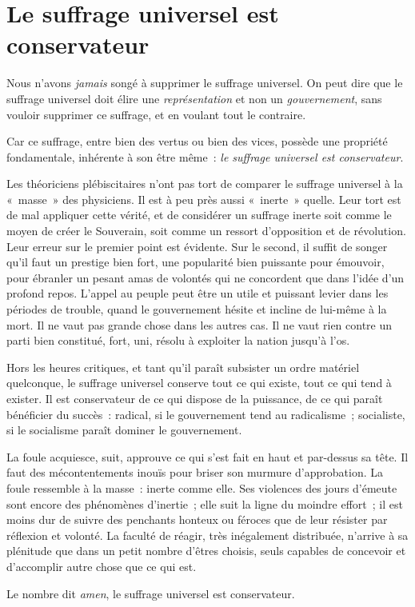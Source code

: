\documentclass[french,twoside]{book} %
\begin{document}
\section[{Le suffrage universel est conservateur}]{Le suffrage universel est conservateur}
\noindent Nous n’avons \emph{jamais} songé à supprimer le suffrage universel. On peut dire que le suffrage universel doit élire une \emph{représentation} et non un \emph{gouvernement}, sans vouloir supprimer ce suffrage, et en voulant tout le contraire.\par
Car ce suffrage, entre bien des vertus ou bien des vices, possède une propriété fondamentale, inhérente à son être même : \emph{le suffrage universel est conservateur}.\par
Les théoriciens plébiscitaires n’ont pas tort de comparer le suffrage universel à la « masse » des physiciens. Il est à peu près aussi « inerte » quelle. Leur tort est de mal appliquer cette vérité, et de considérer un suffrage inerte soit comme le moyen de créer le Souverain, soit comme un ressort d’opposition et de révolution. Leur erreur sur le premier point est évidente. Sur le second, il suffit de songer qu’il faut un prestige bien fort, une popularité bien puissante pour émouvoir, pour ébranler un pesant amas de volontés qui ne concordent que dans l’idée d’un profond repos. L’appel au peuple peut être un utile et puissant levier dans les périodes de trouble, quand le gouvernement hésite et incline de lui-même à la mort. Il ne vaut pas grande chose dans les autres cas. Il ne vaut rien contre un parti bien constitué, fort, uni, résolu à exploiter la nation jusqu’à l’os.\par
Hors les heures critiques, et tant qu’il paraît subsister un ordre matériel quelconque, le suffrage universel conserve tout ce qui existe, tout ce qui tend à exister. Il est conservateur de ce qui dispose de la puissance, de ce qui paraît bénéficier du succès : radical, si le gouvernement tend au radicalisme ; socialiste, si le socialisme paraît dominer le gouvernement.\par
La foule acquiesce, suit, approuve ce qui s’est fait en haut et par-dessus sa tête. Il faut des mécontentements inouïs pour briser son murmure d’approbation. La foule ressemble à la masse : inerte comme elle. Ses violences des jours d’émeute sont encore des phénomènes d’inertie ; elle suit la ligne du moindre effort ; il est moins dur de suivre des penchants honteux ou féroces que de leur résister par réflexion et volonté. La faculté de réagir, très inégalement distribuée, n’arrive à sa plénitude que dans un petit nombre d’êtres choisis, seuls capables de concevoir et d’accomplir autre chose que ce qui est.\par
Le nombre dit \emph{amen}, le suffrage universel est conservateur.
\end{document}
